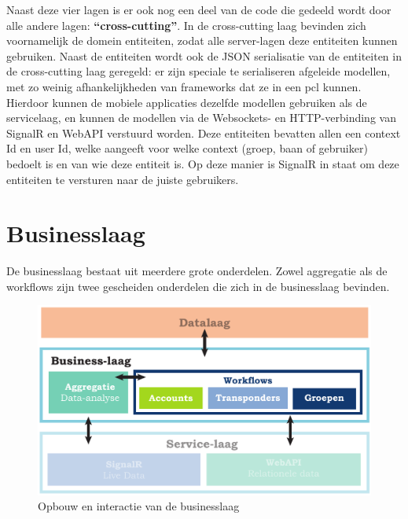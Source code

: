 Naast deze vier lagen is er ook nog een deel van de code die gedeeld wordt door alle andere lagen: \textbf{``cross-cutting''}. In de cross-cutting laag bevinden zich voornamelijk de domein entiteiten, zodat alle server-lagen deze entiteiten kunnen gebruiken. Naast de entiteiten wordt ook de JSON serialisatie van de entiteiten in de cross-cutting laag geregeld: er zijn  speciale te serialiseren afgeleide modellen, met zo weinig afhankelijkheden van frameworks dat ze in een \ac{pcl} kunnen. Hierdoor kunnen de mobiele applicaties dezelfde modellen gebruiken als de servicelaag, en kunnen de modellen via de Websockets- en HTTP-verbinding van SignalR en WebAPI verstuurd worden. Deze entiteiten bevatten allen een context Id en user Id, welke aangeeft voor welke context (groep, baan of gebruiker) bedoelt is en van wie deze entiteit is. Op deze manier is SignalR in staat om deze entiteiten te versturen naar de juiste gebruikers.

  

\section{Businesslaag}
  De businesslaag bestaat uit meerdere grote onderdelen. Zowel aggregatie als de workflows zijn twee gescheiden onderdelen die zich in de businesslaag bevinden.
 
\begin{figure}[ht]
  \begin{center}
  \includegraphics[width=.6\textwidth]{style/images/Businesslaag}    
  \end{center}
  \caption{Opbouw en interactie van de businesslaag}  
  \label{fig:lagen-businesslaag}
\end{figure}
  
  
  
  
  
